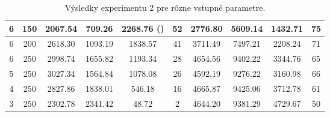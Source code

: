 \documentclass[a4paper, 11pt]{article}
\begin{document}
\begin{table}[H]
{\begin{tabular}{|c|c|c|c|c|c|c|c|c|c|}
			6 & 150 & 2067.54 & 709.26 & 2268.76 () & 52 & 2776.80 & 5609.14 & 1432.71 & 75 \\ \hline
			6 & 200 & 2618.30 & 1093.19 & 1838.57 & 41 & 3711.49 & 7497.21 & 2208.24 & 71 \\ \hline
			6 & 250 & 2998.74 & 1655.82 & 1193.34 & 28 & 4654.56 & 9402.22 & 3344.76 & 65 \\ \hline
			5 & 250 & 3027.34 & 1564.84 & 1078.08 & 26 & 4592.19 & 9276.22 & 3160.98 & 66 \\ \hline
			4 & 250 & 2827.86 & 1838.01 & 546.18 & 16 & 4665.87 & 9425.06 & 3712.78 & 61 \\ \hline
			3 & 250 & 2302.78 & 2341.42 & 48.72 & 2 & 4644.20 & 9381.29 & 4729.67 & 50 \\ \hline
		\end{tabular}%
	}
	\caption{Výsledky experimentu 2 pre rôzne vstupné parametre.}
	\label{tab:exp2}
\end{table}
\end{document}
